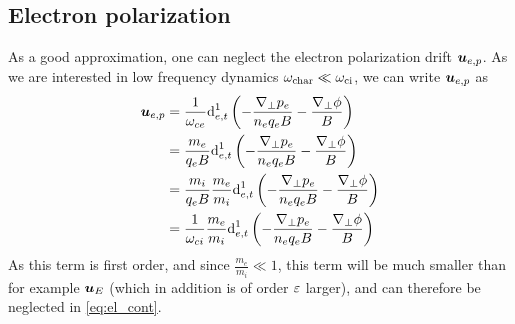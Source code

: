 \subsection{Electron polarization}
\label{sec:no_e_pol}
%
As a good approximation, one can neglect the electron polarization drift $\boldsymbol{u}_{e,p}$.
As we are interested in low frequency dynamics $\omega_{\text{char}}\ll\omega_{\text{ci}}$, we can write $\boldsymbol{u}_{e,p}$ as
%
\begin{align*}
    \ve{u}_{e,p}
    &=
      \frac{1}{\om_{ce}}\d^1_{e,t}\L(
      - \frac{\grad_\perp p_e}{n_e  q_e B}
      - \frac{\grad_\perp \phi}{B}
      \R)\\
%
    &=
      \frac{m_e}{q_eB}\d^1_{e,t}\L(
      - \frac{\grad_\perp p_e}{n_e  q_e B}
      - \frac{\grad_\perp \phi}{B}
      \R)\\
%
    &=
      \frac{m_i}{q_eB}\frac{m_e}{m_i}\d^1_{e,t}\L(
      - \frac{\grad_\perp p_e}{n_e  q_e B}
      - \frac{\grad_\perp \phi}{B}
      \R)\\
%
    &=
    \frac{1}{\om_{ci}}\frac{m_e}{m_i}\d^1_{e,t}\L(
      - \frac{\grad_\perp p_e}{n_e  q_e B}
      - \frac{\grad_\perp \phi}{B}
      \R)
\end{align*}
%
As this term is first order, and since $\frac{m_e}{m_i} \ll 1$, this term will be much smaller than for example $\boldsymbol{u}_E$ (which in addition is of order $\varepsilon$ larger), and can therefore be neglected in \cref{eq:el_cont}.

